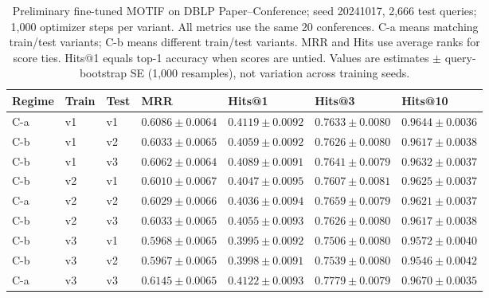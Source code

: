 \begin{table}[htbp]
\centering
\small
\renewcommand{\arraystretch}{1.15}
\setlength{\tabcolsep}{5pt}
\begin{adjustbox}{max width=\linewidth}
\begin{tabular}{|l|l|l|l|l|l|l|}
\hline
\textbf{Regime} & \textbf{Train} & \textbf{Test} & \textbf{MRR} & \textbf{Hits@1} & \textbf{Hits@3} & \textbf{Hits@10} \\
\hline
C-a & v1 & v1 & $0.6086 \pm 0.0064$ & $0.4119 \pm 0.0092$ & $0.7633 \pm 0.0080$ & $0.9644 \pm 0.0036$ \\
\hline
C-b & v1 & v2 & $0.6033 \pm 0.0065$ & $0.4059 \pm 0.0092$ & $0.7626 \pm 0.0080$ & $0.9617 \pm 0.0038$ \\
\hline
C-b & v1 & v3 & $0.6062 \pm 0.0064$ & $0.4089 \pm 0.0091$ & $0.7641 \pm 0.0079$ & $0.9632 \pm 0.0037$ \\
\hline
C-b & v2 & v1 & $0.6010 \pm 0.0067$ & $0.4047 \pm 0.0095$ & $0.7607 \pm 0.0081$ & $0.9625 \pm 0.0037$ \\
\hline
C-a & v2 & v2 & $0.6029 \pm 0.0066$ & $0.4036 \pm 0.0094$ & $0.7659 \pm 0.0079$ & $0.9621 \pm 0.0037$ \\
\hline
C-b & v2 & v3 & $0.6033 \pm 0.0065$ & $0.4055 \pm 0.0093$ & $0.7626 \pm 0.0080$ & $0.9617 \pm 0.0038$ \\
\hline
C-b & v3 & v1 & $0.5968 \pm 0.0065$ & $0.3995 \pm 0.0092$ & $0.7506 \pm 0.0080$ & $0.9572 \pm 0.0040$ \\
\hline
C-b & v3 & v2 & $0.5967 \pm 0.0065$ & $0.3998 \pm 0.0091$ & $0.7539 \pm 0.0080$ & $0.9546 \pm 0.0042$ \\
\hline
C-a & v3 & v3 & $0.6145 \pm 0.0065$ & $0.4122 \pm 0.0093$ & $0.7779 \pm 0.0079$ & $0.9670 \pm 0.0035$ \\
\hline
\end{tabular}
\end{adjustbox}
\caption{Preliminary fine-tuned MOTIF on DBLP Paper--Conference; seed 20241017, 2,666 test queries; 1,000 optimizer steps per variant. All metrics use the same 20 conferences. C-a means matching train/test variants; C-b means different train/test variants. MRR and Hits use average ranks for score ties. Hits@1 equals top-1 accuracy when scores are untied. Values are estimates $\pm$ query-bootstrap SE (1,000 resamples), not variation across training seeds.}
\label{tab:motif-dblp-matrix-link-prediction}
\end{table}
